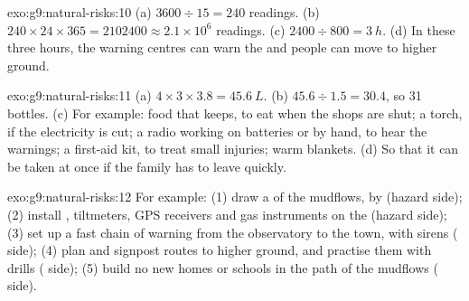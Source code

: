 \begin{solution}{exo:g9:natural-risks:10}
(a) $3600 \div 15 = 240$ readings. (b) $240 \times 24 \times 365 =
\num{2102400} \approx 2.1 \times 10^6$ readings. (c) $2400 \div 800 =
\qty{3}{h}$. (d) In these three hours, the warning centres can warn the
 and people can move to higher ground.
\end{solution}

\begin{solution}{exo:g9:natural-risks:11}
(a) $4 \times 3 \times 3.8 = \qty{45.6}{L}$. (b) $45.6 \div 1.5 = 30.4$,
so 31 bottles. (c) For example: food that keeps, to eat when the shops
are shut; a torch, if the electricity is cut; a radio working on
batteries or by hand, to hear the warnings; a first-aid kit, to treat
small injuries; warm blankets. (d) So that it can be taken at once if the
family has to leave quickly.
\end{solution}

\begin{solution}{exo:g9:natural-risks:12}
For example: (1) draw a  of the mudflows,  by 
(hazard side); (2) install , tiltmeters, GPS receivers and gas
instruments on the  (hazard side); (3) set up a fast chain of
warning from the observatory to the town, with sirens (
side); (4) plan and signpost routes to higher ground, and practise them
with drills ( side); (5) build no new homes or schools in the
path of the mudflows ( side).
\end{solution}

